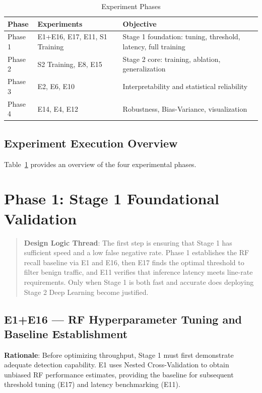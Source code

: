 \documentclass[sigconf]{acmart}
\begin{document}
\begin{table}[!t]
\caption{Experiment Phases}
\label{tab:experiments}
\begin{tabular}{p{1.5cm}p{5.5cm}p{9.0cm}}
\toprule
\textbf{Phase} & \textbf{Experiments} & \textbf{Objective} \\
\midrule
Phase 1 & E1+E16, E17, E11, S1 Training & Stage 1 foundation: tuning, threshold, latency, full training \\
Phase 2 & S2 Training, E8, E15 & Stage 2 core: training, ablation, generalization \\
Phase 3 & E2, E6, E10 & Interpretability and statistical reliability \\
Phase 4 & E14, E4, E12 & Robustness, Bias-Variance, visualization \\
\bottomrule
\end{tabular}
\end{table}

\subsection{Experiment Execution Overview} Table~\ref{tab:experiments} provides an overview of the four experimental phases.

\section{Phase 1: Stage 1 Foundational Validation}
\begin{quote}
\textbf{Design Logic Thread}: The first step is ensuring that Stage 1 has sufficient speed and a low false negative rate. Phase 1 establishes the RF recall baseline via E1 and E16, then E17 finds the optimal threshold to filter benign traffic, and E11 verifies that inference latency meets line-rate requirements. Only when Stage 1 is both fast and accurate does deploying Stage 2 Deep Learning become justified.
\end{quote}

\subsection{E1+E16 --- RF Hyperparameter Tuning and Baseline Establishment}
\textbf{Rationale}: Before optimizing throughput, Stage 1 must first demonstrate adequate detection capability. E1 uses Nested Cross-Validation to obtain unbiased RF performance estimates, providing the baseline for subsequent threshold tuning (E17) and latency benchmarking (E11).
\end{document}

